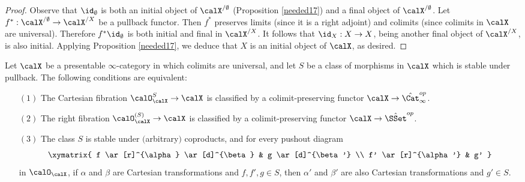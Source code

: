 \begin{proof}
Observe that $\id_{\emptyset}$ is both an initial object of $\calX^{/ \emptyset}$ (Proposition \ref{needed17}) and a final object of $\calX^{/\emptyset}$. Let $f^{\ast}: \calX^{/\emptyset} \rightarrow \calX^{/X}$ be a pullback functor. Then $f^{\ast}$ preserves limits (since it is a right adjoint) and colimits (since colimits in $\calX$ are universal). Therefore $f^{\ast} \id_{\emptyset}$
is both initial and final in $\calX^{/X}$. It follows that $\id_{X}: X \rightarrow X$, being another final object of $\calX^{/X}$, is also initial. Applying Proposition \ref{needed17}, we deduce that
$X$ is an initial object of $\calX$, as desired.
\end{proof}

\begin{lemma}\label{ib3}
Let $\calX$ be a presentable $\infty$-category in which colimits are universal, and let
$S$ be a class of morphisms in $\calX$ which is stable under pullback. The following conditions are equivalent:
\begin{itemize}
\item[$(1)$] The Cartesian fibration $\calO^{S}_{\calX} \rightarrow \calX$ is classified by a 
colimit-preserving functor $\calX \rightarrow \hat{\Cat}^{op}_{\infty}$. 
\item[$(2)$] The right fibration $\calO^{(S)}_{\calX} \rightarrow \calX$ is classified by a colimit-preserving functor $\calX \rightarrow \hat{\SSet}^{op}$.  
\item[$(3)$] The class $S$ is stable under $($arbitrary$)$ coproducts, and 
for every pushout diagram
$$ \xymatrix{ f \ar[r]^{\alpha} \ar[d]^{\beta} & g \ar[d]^{\beta'} \\
f' \ar[r]^{\alpha'} & g' }$$
in $\calO_{\calX}$, if $\alpha$ and $\beta$ are Cartesian transformations and
$f,f',g \in S$, then $\alpha'$ and $\beta'$ are also Cartesian transformations and $g' \in S$.
\end{itemize}
\end{lemma}

